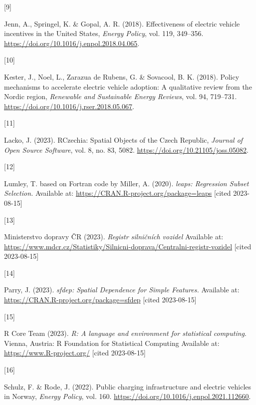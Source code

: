 \documentclass{mmeproc}
\newlength{\cslhangindent}
\newlength{\csllabelwidth}
\newenvironment{CSLReferences}[2] %
 {%
  \setlength{\parindent}{0pt}
  \ifodd #1
  \fi
  \setlength{\parskip}{-2pt}
 }%
 {}
\newcommand{\CSLLeftMargin}[1]{\parbox[t]{\csllabelwidth}{#1}}
\newcommand{\CSLRightInline}[1]{\parbox[t]{\linewidth - \csllabelwidth}{#1}\break}
\begin{document}
\begin{CSLReferences}{0}{0}
\leavevmode{}%
\CSLLeftMargin{{[}9{]} }%
\CSLRightInline{Jenn, A., Springel, K. \& Gopal, A. R. (2018). {Effectiveness
of electric vehicle incentives in the {United} {States},} \emph{Energy
Policy}, vol. 119, 349--356. \url{https://doi.org/10.1016/j.enpol.2018.04.065}.}

\leavevmode{}%
\CSLLeftMargin{{[}10{]} }%
\CSLRightInline{Kester, J., Noel,  L., Zarazua de Rubens,  G. \& 
Sovacool, B. K. (2018). {Policy mechanisms to accelerate electric vehicle adoption:
{A} qualitative review from the {Nordic} region,} \emph{Renewable and
Sustainable Energy Reviews}, vol. 94, 719--731. \url{https://doi.org/10.1016/j.rser.2018.05.067}.}

\leavevmode{}%
\CSLLeftMargin{{[}11{]} }%
\CSLRightInline{Lacko, J. (2023). {{RCzechia}: {Spatial} {Objects} of the
{Czech} {Republic},} \emph{Journal of Open Source Software}, vol. 8,
no. 83, 5082. \url{https://doi.org/10.21105/joss.05082}.}

\leavevmode{}%
\CSLLeftMargin{{[}12{]} }%
\CSLRightInline{Lumley, T. based on Fortran code by Miller, A. (2020).
\emph{{leaps}: {Regression} {Subset} {Selection}.} Available at:
\url{https://CRAN.R-project.org/package=leaps} {{[}cited 2023-08-15{]}}}

\leavevmode{}%
\CSLLeftMargin{{[}13{]} }%
\CSLRightInline{Ministerstvo dopravy ČR (2023). \emph{Registr silničních
vozidel} Available at:
\url{https://www.mdcr.cz/Statistiky/Silnicni-doprava/Centralni-registr-vozidel} {{[}cited 2023-08-15{]}}}

\leavevmode{}%
\CSLLeftMargin{{[}14{]} }%
\CSLRightInline{Parry, J. (2023). \emph{{sfdep}: {Spatial} {Dependence} for
{Simple} {Features}.} Available at:
\url{https://CRAN.R-project.org/package=sfdep} {{[}cited 2023-08-15{]}}}

\leavevmode{}%
\CSLLeftMargin{{[}15{]} }%
\CSLRightInline{R Core Team (2023). \emph{R: A language and environment for
statistical computing}. Vienna, Austria: R Foundation for Statistical
Computing Available at: \url{https://www.R-project.org/} {{[}cited 2023-08-15{]}}}

\leavevmode{}%
\CSLLeftMargin{{[}16{]} }%
\CSLRightInline{Schulz, F. \& Rode, J. (2022). {Public charging infrastructure
and electric vehicles in {Norway},} \emph{Energy Policy}, vol. 160. 
\url{https://doi.org/10.1016/j.enpol.2021.112660}.}


\end{CSLReferences}
\end{document}
